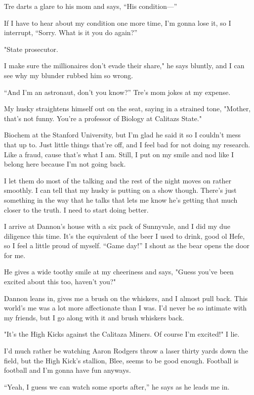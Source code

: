 Tre darts a glare to his mom and says, ``His condition---''

If I have to hear about my condition one more time, I'm gonna lose it,
so I interrupt, ``Sorry. What is it you do again?''

"State prosecutor.

I make sure the millionaires don't evade their share," he says bluntly,
and I can see why my blunder rubbed him so wrong.

``And I'm an astronaut, don't you know?'' Tre's mom jokes at my expense.

My husky straightens himself out on the seat, saying in a strained tone,
"Mother, that's not funny. You're a professor of Biology at Calitazs
State."

Biochem at the Stanford University, but I'm glad he said it so I
couldn't mess that up to. Just little things that're off, and I feel bad
for not doing my research. Like a fraud, cause that's what I am. Still,
I put on my smile and nod like I belong here because I'm not going back.

I let them do most of the talking and the rest of the night moves on
rather smoothly. I can tell that my husky is putting on a show though.
There's just something in the way that he talks that lets me know he's
getting that much closer to the truth. I need to start doing better.

I arrive at Dannon's house with a six pack of Sunnyvale, and I did my
due diligence this time. It's the equivalent of the beer I used to
drink, good ol Hefe, so I feel a little proud of myself. ``Game day!'' I
shout as the bear opens the door for me.

He gives a wide toothy smile at my cheeriness and says, "Guess you've
been excited about this too, haven't you?"

Dannon leans in, gives me a brush on the whiskers, and I almost pull
back. This world's me was a lot more affectionate than I was. I'd never
be so intimate with my friends, but I go along with it and brush
whiskers back.

"It's the High Kicks against the Calitaza Miners. Of course I'm
excited!" I lie.

I'd much rather be watching Aaron Rodgers throw a laser thirty yards
down the field, but the High Kick's stallion, Blee, seems to be good
enough. Football is football and I'm gonna have fun anyways.

``Yeah, I guess we can watch some sports after,'' he says as he leads me
in.

